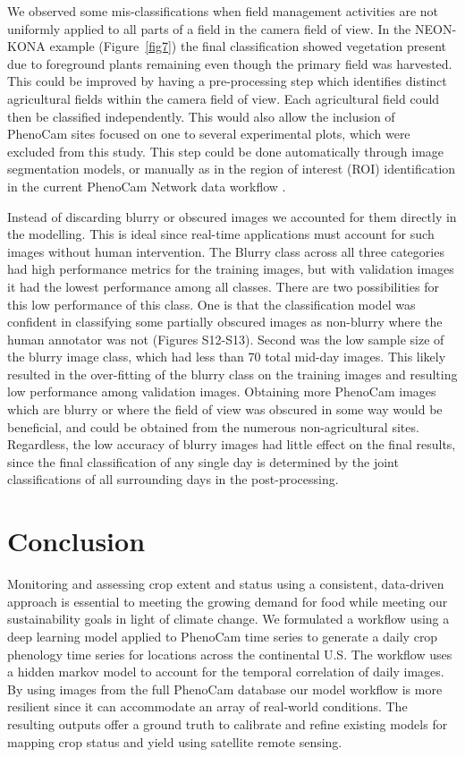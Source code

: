 \documentclass[remotesensing,article,submit,moreauthors,pdftex]{Definitions/mdpi}
\begin{document}
We observed some mis-classifications when field management activities are not uniformly applied to all parts of a field in the camera field of view. In the NEON-KONA example (Figure~\ref{fig7}) the final classification showed vegetation present due to foreground plants remaining even though the primary field was harvested. This could be improved by having a pre-processing step which identifies distinct agricultural fields within the camera field of view. Each agricultural field could then be classified independently. This would also allow the inclusion of PhenoCam sites focused on one to several experimental plots, which were excluded from this study. This step could be done automatically through image segmentation models, or manually as in the region of interest (ROI) identification in the current PhenoCam Network data workflow \citep{richardson2018a}.

Instead of discarding blurry or obscured images we accounted for them directly in the modelling. This is ideal since real-time applications must account for such images without human intervention. The Blurry class across all three categories had high performance metrics for the training images, but with validation images it had the lowest performance among all classes. There are two possibilities for this low performance of this class. One is that the classification model was confident in classifying some partially obscured images as non-blurry where the human annotator was not (Figures S12-S13). Second was the low sample size of the blurry image class, which had less than 70 total mid-day images. This likely resulted in the over-fitting of the blurry class on the training images and resulting low performance among validation images. Obtaining more PhenoCam images which are blurry or where the field of view was obscured in some way would be beneficial, and could be obtained from the numerous non-agricultural sites. Regardless, the low accuracy of blurry images had little effect on the final results, since the final classification of any single day is determined by the joint classifications of all surrounding days in the post-processing. 

\section{Conclusion}

Monitoring and assessing crop extent and status using a consistent, data-driven approach is essential to meeting the growing demand for food while meeting our sustainability goals in light of climate change. We formulated a workflow using a deep learning model applied to PhenoCam time series to generate a daily crop phenology time series for locations across the continental U.S. The workflow uses a hidden markov model to account for the temporal correlation of daily images. By using images from the full PhenoCam database our model workflow is more resilient since it can accommodate an array of real-world conditions. The resulting outputs offer a ground truth to calibrate and refine existing models for mapping crop status and yield using satellite remote sensing. 
\end{document}
